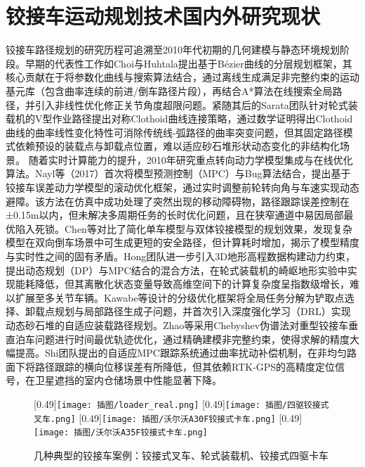 \documentclass[master,academic]{ysuthesis} %
\begin{document}
	\section{铰接车运动规划技术国内外研究现状}
	铰接车路径规划的研究历程可追溯至2010年代初期的几何建模与静态环境规划阶段。早期的代表性工作如Choi与Huhtala提出基于Bézier曲线的分层规划框架，其核心贡献在于将参数化曲线与搜索算法结合，通过离线生成满足非完整约束的运动基元库（包含曲率连续的前进/倒车路径片段），再结合A*算法在线搜索全局路径，并引入非线性优化修正关节角度超限问题。紧随其后的Sarata团队针对轮式装载机的V型作业路径提出对称Clothoid曲线连接策略，通过数学证明得出Clothoid曲线的曲率线性变化特性可消除传统线-弧路径的曲率突变问题，但其固定路径模式依赖预设的装载点与卸载点位置，难以适应砂石堆形状动态变化的非结构化场景。 随着实时计算能力的提升，2010年研究重点转向动力学模型集成与在线优化算法。Nayl等（2017）首次将模型预测控制（MPC）与Bug算法结合，提出基于铰接车误差动力学模型的滚动优化框架，通过实时调整前轮转向角与车速实现动态避障。该方法在仿真中成功处理了突然出现的移动障碍物，路径跟踪误差控制在±0.15m以内，但未解决多周期任务的长时优化问题，且在狭窄通道中易因局部最优陷入死锁。Chen等对比了简化单车模型与双体铰接模型的规划效果，发现复杂模型在双向倒车场景中可生成更短的安全路径，但计算耗时增加，揭示了模型精度与实时性之间的固有矛盾。Hong团队进一步引入3D地形高程数据构建动力约束，提出动态规划（DP）与MPC结合的混合方法，在轮式装载机的崎岖地形实验中实现能耗降低，但其离散化状态变量导致高维空间下的计算复杂度呈指数级增长，难以扩展至多关节车辆。Kawabe等设计的分级优化框架将全局任务分解为铲取点选择、卸载点规划与局部路径生成子问题，并首次引入深度强化学习（DRL）实现动态砂石堆的自适应装载路径规划。Zhao等采用Chebyshev伪谱法对重型铰接车垂直泊车问题进行时间最优轨迹优化，通过精确建模非完整约束，使得求解的精度大幅提高。Shi团队提出的自适应MPC跟踪系统通过曲率扰动补偿机制，在非均匀路面下将路径跟踪的横向位移误差有所降低，但其依赖RTK-GPS的高精度定位信号，在卫星遮挡的室内仓储场景中性能显著下降。
	\begin{figure}[!ht]
		\centering
		[0.49\textwidth]{\texttt{[image: 插图/loader\_real.png]}}
		[0.49\textwidth]{\texttt{[image: 插图/四驱铰接式叉车.png]}}
		[0.49\textwidth]{\texttt{[image: 插图/沃尔沃A30F铰接式卡车.png]}}
		[0.49\textwidth]{\texttt{[image: 插图/沃尔沃A35F铰接式卡车.png]}}
		\caption{几种典型的铰接车案例：铰接式叉车、轮式装载机、铰接式四驱卡车}
		\label{fig:几种典型的铰接车案例}
	\end{figure}
\end{document}
